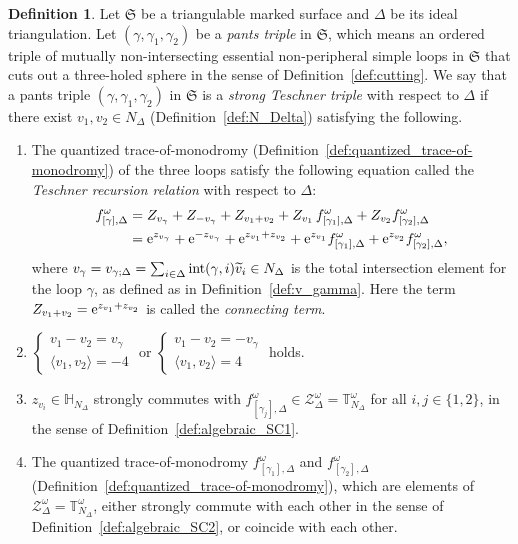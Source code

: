 \documentclass[pdftex]{sigma}
\numberwithin{equation}{section}
\theoremstyle{definition}
\newtheorem{Definition}[Theorem]{Definition}
\newcommand{\til}[1]{\widetilde{#1}}
\begin{document}
\begin{Definition}
\label{def:Teschner_triple_level1}
Let $\mathfrak{S}$ be a triangulable marked surface and $\Delta$ be its ideal triangulation. Let $(\gamma,\gamma_1,\gamma_2)$ be a {\em pants triple} in $\mathfrak{S}$, which means an ordered triple of mutually non-intersecting essential non-peripheral simple loops in $\mathfrak{S}$ that cuts out a three-holed sphere in the sense of Definition~\ref{def:cutting}.
We say that a pants triple $(\gamma,\gamma_1,\gamma_2)$ in $\mathfrak{S}$ is a {\em strong Teschner triple} with respect to $\Delta$ if there exist $v_1,v_2 \in N_\Delta$ (Definition~\ref{def:N_Delta}) satisfying the following.
\begin{enumerate}[label={\rm (TR\arabic*)}]\itemsep=0pt\setlength{\leftskip}{0.28cm}
\item\label{TR1} The quantized trace-of-monodromy (Definition~\ref{def:quantized_trace-of-monodromy}) of the three loops satisfy the following equation called the {\em Teschner recursion relation} with respect to $\Delta$:
\begin{align}
f^\omega_{[\gamma],\Delta}
& = Z_{v_\gamma} + Z_{-v_\gamma} + Z_{v_1+v_2} + Z_{v_1} \, f^\omega_{[\gamma_1],\Delta}
+ Z_{v_2} f^\omega_{[\gamma_2],\Delta} \nonumber\\
& = {\rm e}^{z_{v_\gamma}} + {\rm e}^{-z_{v_\gamma}} + {\rm e}^{z_{v_1} + z_{v_2}} + {\rm e}^{z_{v_1}} f^\omega_{[\gamma_1],\Delta} + {\rm e}^{z_{v_2}} f^\omega_{[\gamma_2],\Delta},\label{eq:TR1}
\end{align}
where $v_\gamma = v_{\gamma;\Delta} = \sum_{i\in \Delta} {\rm int}(\gamma,i) \til{v}_i \in N_\Delta$ is the total intersection element for the loop $\gamma$, as defined as in Definition~\ref{def:v_gamma}. Here the term $Z_{v_1+v_2} = {\rm e}^{z_{v_1} + z_{v_2}}$ is called the {\em connecting term}.
\item\label{TR2} $\begin{cases} v_1 - v_2 = v_\gamma \\ \langle v_1, v_2 \rangle = -4 \end{cases}$ or $\begin{cases} v_1 - v_2 = - v_\gamma \\ \langle v_1, v_2 \rangle = 4 \end{cases}$ holds.
\item\label{TR3} $z_{v_i} \in \mathbb{H}_{N_\Delta}$ strongly commutes with $f^\omega_{[\gamma_j],\Delta} \in \mathcal{Z}^\omega_\Delta = \mathbb{T}^\omega_{N_\Delta}$ for all $i,j\in\{1,2\}$, in the sense of Definition~\ref{def:algebraic_SC1}.
\item\label{TR4} The quantized trace-of-monodromy $f^\omega_{[\gamma_1],\Delta}$ and $f^\omega_{[\gamma_2],\Delta}$ (Definition~\ref{def:quantized_trace-of-monodromy}), which are elements of $\mathcal{Z}^\omega_\Delta = \mathbb{T}^\omega_{N_\Delta}$, either strongly commute with each other in the sense of Definition~\ref{def:algebraic_SC2}, or coincide with each other.
\end{enumerate}
\end{Definition}
\end{document}

